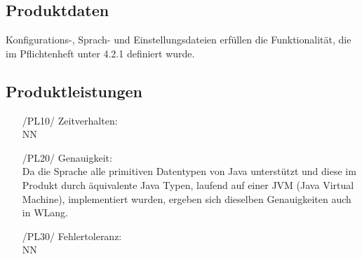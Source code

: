 \documentclass[parskip=full]{scrartcl}
\begin{document}
	\subsection{Produktdaten}
	Konfigurations-, Sprach- und Einstellungsdateien erfüllen die Funktionalität, die im Pflichtenheft unter 4.2.1 definiert wurde.
%		
%		
%			
%			
			
			 
		\subsection{Produktleistungen}
		\begin{itemize}
		\item[/PL10/] Zeitverhalten: \\ NN

		\item[/PL20/] Genauigkeit: \\
		Da die Sprache alle primitiven Datentypen von Java unterstützt und diese im Produkt durch äquivalente Java Typen, laufend auf einer JVM (Java Virtual Machine), implementiert wurden, ergeben sich dieselben Genauigkeiten auch in WLang. 

		\item[/PL30/] Fehlertoleranz: \\ NN
		\end{itemize}
		
\end{document}

